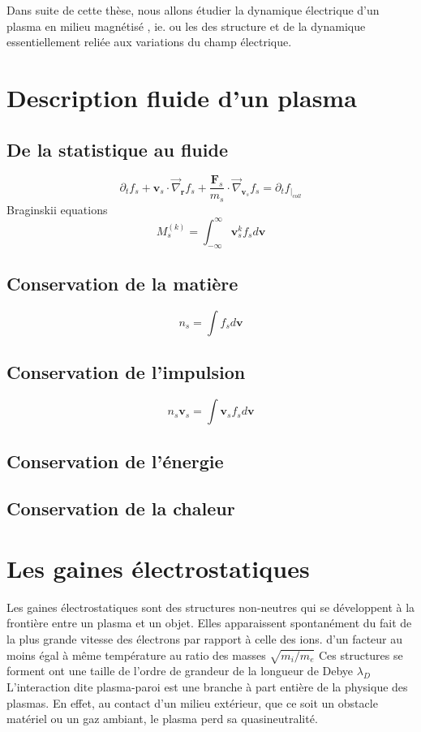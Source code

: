 			
			
			Dans suite de cette thèse, nous allons étudier la dynamique électrique d'un plasma en milieu magnétisé
			, ie. ou les 
			des structure et de la dynamique essentiellement reliée aux variations du champ électrique.
	\section{Description fluide d'un plasma}
		
		\subsection{De la statistique au fluide}
			$$\partial_tf_s+\mathbf{v}_s\cdot\vec\nabla_\mathbf{r}f_s+\frac{\mathbf{F}_s}{m_s}\cdot\vec\nabla_{\mathbf{v}_s}f_s=\partial_tf_{|_{coll}}$$
			Braginskii equations
			$$M^{(k)}_s=\int_{-\infty}^{\infty}\mathbf{v}_s^kf_sd\mathbf{v}$$
		\subsection{Conservation de la matière}
			$$n_s=\int f_sd\mathbf{v}$$
			
		\subsection{Conservation de l'impulsion}
			$$n_s\mathbf{v}_s=\int \mathbf{v}_sf_sd\mathbf{v}$$
		\subsection{Conservation de l'énergie}
		\subsection{Conservation de la chaleur}
	\section{Les gaines électrostatiques}
			Les gaines électrostatiques sont des structures non-neutres qui se
			développent à la frontière entre un plasma et un objet. Elles apparaissent
			spontanément du fait de la plus grande vitesse des électrons par rapport à
			celle des ions.  d'un facteur au moins égal à même température au ratio des
			masses $\sqrt{m_i/m_e}$ Ces structures se forment ont une taille de l'ordre de grandeur de la longueur de Debye $\lambda_D$
			L'interaction dite plasma-paroi est une branche à part entière de la physique des plasmas.
			En effet, au contact d'un milieu extérieur, que ce soit un obstacle matériel
			ou un gaz ambiant, le plasma perd sa quasineutralité.
